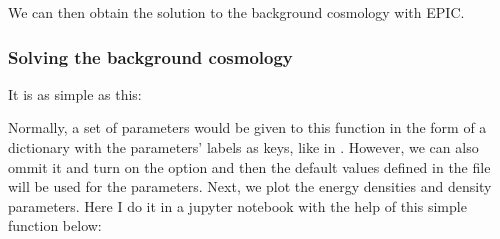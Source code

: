 \documentclass[letterpaper,12pt,english]{sphinxhowto}
\begin{document}
%
\begin{sphinxVerbatim}[commandchars=\\\{\}]
  
   
   \PYG{p}{[} \PYG{p}{]} 
   \PYG{p}{[}\PYG{p}{]}
   
\end{sphinxVerbatim}

We can then obtain the solution to the background cosmology with EPIC.


\subsubsection{Solving the background cosmology}
\label{\detokenize{cosmology_module:solving-the-background-cosmology}}
It is as simple as this:

%
\begin{sphinxVerbatim}[commandchars=\\\{\}]
\end{sphinxVerbatim}

Normally, a set of parameters would be given to this function in the
form of a dictionary with the parameters’ labels as keys, like in
.
However, we can also ommit it and turn on the option 
and then the default values defined in the
 file will be used for
the parameters. Next, we plot the energy densities and density
parameters. Here I do it in a jupyter notebook with the help of this
simple function below:
\end{document}
